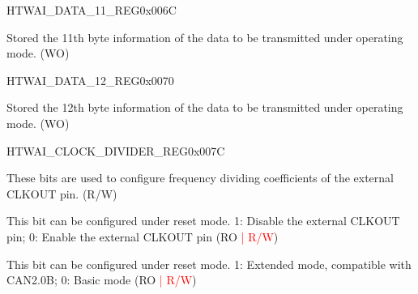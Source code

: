 \begin{register}{H}{TWAI\_DATA\_11\_REG}{0x006C}\label{regdesc:TWAIDATA11REG}
%
%
\regnewline%
\begin{regdesc}\begin{reglist}
\label{fielddesc:TWAITXBYTE11}\item [TWAI\_TX\_BYTE\_11] Stored the 11th byte information of the data to be transmitted under operating mode. (WO)
\end{reglist}\end{regdesc}
\end{register}


\begin{register}{H}{TWAI\_DATA\_12\_REG}{0x0070}\label{regdesc:TWAIDATA12REG}
%
%
\regnewline%
\begin{regdesc}\begin{reglist}
\label{fielddesc:TWAITXBYTE12}\item [TWAI\_TX\_BYTE\_12] Stored the 12th byte information of the data to be transmitted under operating mode. (WO)
\end{reglist}\end{regdesc}
\end{register}


\begin{register}{H}{TWAI\_CLOCK\_DIVIDER\_REG}{0x007C}\label{regdesc:TWAICLOCKDIVIDERREG}
%
%
%
%
%
\regnewline%
\begin{regdesc}\begin{reglist}
\label{fielddesc:TWAICD}\item [TWAI\_CD] These bits are used to configure frequency dividing coefficients of the external CLKOUT pin. (R/W)
\label{fielddesc:TWAICLOCKOFF}\item [TWAI\_CLOCK\_OFF] This bit can be configured under reset mode. 1: Disable the external CLKOUT pin; 0: Enable the external CLKOUT pin (RO \textcolor{red}{| R/W})
\label{fielddesc:TWAIEXTMODE}\item [TWAI\_EXT\_MODE] This bit can be configured under reset mode. 1: Extended mode, compatible with CAN2.0B; 0: Basic mode (RO \textcolor{red}{| R/W})
\end{reglist}\end{regdesc}
\end{register}


